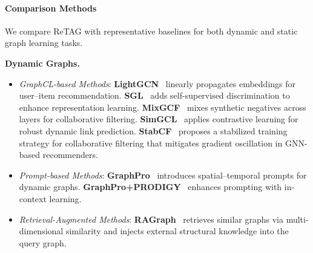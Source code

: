 \paragraph{Comparison Methods}
We compare ReTAG with representative baselines for both dynamic and static graph learning tasks.

\textbf{Dynamic Graphs.}
\begin{itemize}
    \item \textit{GraphCL-based Methods}:
    \textbf{LightGCN}~\cite{lightgcn_reference} linearly propagates embeddings for user–item recommendation. 
    \textbf{SGL}~\cite{sgl_reference} adds self-supervised discrimination to enhance representation learning. 
    \textbf{MixGCF}~\cite{mixgcf_reference} mixes synthetic negatives across layers for collaborative filtering. 
    \textbf{SimGCL}~\cite{simgcl_reference} applies contrastive learning for robust dynamic link prediction.
    \textbf{StabCF}~\cite{wu2026stabcf} proposes a stabilized training strategy for collaborative filtering that mitigates gradient oscillation in GNN-based recommenders.

    \item \textit{Prompt-based Methods}:
    \textbf{GraphPro}~\cite{graphpro_reference} introduces spatial–temporal prompts for dynamic graphs. 
    \textbf{GraphPro+PRODIGY}~\cite{prodigy_reference} enhances prompting with in-context learning.

    \item \textit{Retrieval-Augmented Methods}:
    \textbf{RAGraph}~\cite{JiangQXZZ00X0W24} retrieves similar graphs via multi-dimensional similarity 
    and injects external structural knowledge into the query graph.
\end{itemize}

